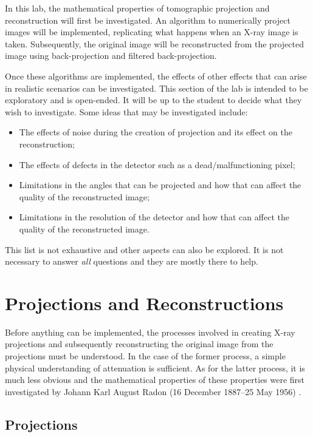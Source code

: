 \documentclass[
  a4paper,             %
  11pt,                %
  oneside,             %
  onecolumn,           %
  bibliography=totoc,  %
  final,               %
]{scrartcl}
\newcounter{question}
\begin{document}
In this lab, the mathematical properties of tomographic projection and
reconstruction will first be investigated.  An algorithm to numerically project
images will be implemented, replicating what happens when an X-ray image is
taken.  Subsequently, the original image will be reconstructed from the
projected image using back-projection and filtered back-projection.

Once these algorithms are implemented, the effects of other effects that can
arise in realistic scenarios can be investigated.  This section of the lab is
intended to be exploratory and is open-ended.  It will be up to the student to
decide what they wish to investigate.  Some ideas that may be investigated
include:
\begin{itemize}
\item The effects of noise during the creation of projection and its effect on
  the reconstruction;
\item The effects of defects in the detector such as a dead/malfunctioning
  pixel;
\item Limitations in the angles that can be projected and how that can affect
  the quality of the reconstructed image;
\item Limitations in the resolution of the detector and how that can affect the
  quality of the reconstructed image.
\end{itemize}
This list is not exhaustive and other aspects can also be explored.  It is not
necessary to answer \emph{all} questions and they are mostly there to help.

\cleardoublepage
\section{Projections and Reconstructions}
\label{sec:projections_and_reconstructions}

Before anything can be implemented, the processes involved in creating X-ray
projections and subsequently reconstructing the original image from the
projections must be understood.  In the case of the former process, a simple
physical understanding of attenuation is sufficient.  As for the latter process,
it is much less obvious and the mathematical properties of these properties were
first investigated by Johann Karl August Radon (16 December 1887--25 May 1956)
\cite{radon17,radon86_translation}.

\subsection{Projections}
\label{subsec:projections}
\end{document}
